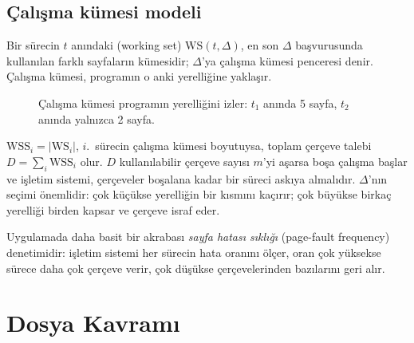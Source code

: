 \subsection{Çalışma kümesi modeli}

Bir sürecin $t$ anındaki  (working set) $\text{WS}(t,\Delta)$, en son $\Delta$ başvurusunda kullanılan farklı sayfaların kümesidir; $\Delta$'ya çalışma kümesi penceresi denir. Çalışma kümesi, programın o anki yerelliğine yaklaşır.

\begin{figure}[H]
\centering
{}
\caption{Çalışma kümesi programın yerelliğini izler: $t_1$ anında 5 sayfa, $t_2$ anında yalnızca 2 sayfa.}
\end{figure}

$\text{WSS}_i = |\text{WS}_i|$, $i$.\ sürecin çalışma kümesi boyutuysa, toplam çerçeve talebi $D = \sum_i \text{WSS}_i$ olur. $D$ kullanılabilir çerçeve sayısı $m$'yi aşarsa boşa çalışma başlar ve işletim sistemi, çerçeveler boşalana kadar bir süreci askıya almalıdır. $\Delta$'nın seçimi önemlidir: çok küçükse yerelliğin bir kısmını kaçırır; çok büyükse birkaç yerelliği birden kapsar ve çerçeve israf eder.

Uygulamada daha basit bir akrabası \emph{sayfa hatası sıklığı} (page-fault frequency) denetimidir: işletim sistemi her sürecin hata oranını ölçer, oran çok yüksekse sürece daha çok çerçeve verir, çok düşükse çerçevelerinden bazılarını geri alır.

\section{Dosya Kavramı}

